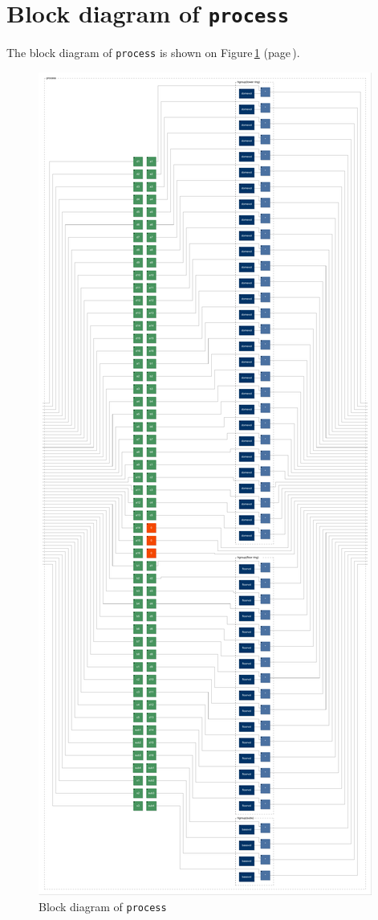 \documentclass{article}
\begin{document}
 \section{Block diagram of \texttt{process}} \label{diagram}  The block diagram of \texttt{process} is shown on Figure\,\ref{figure1} (page\,\pageref{figure1}). \begin{figure}[ht!]
	\centering
	\includegraphics[width=\textwidth]{../svg/svg-01/process}
	\caption{Block diagram of \texttt{process}}
	\label{figure1}
\end{figure}
\end{document}
